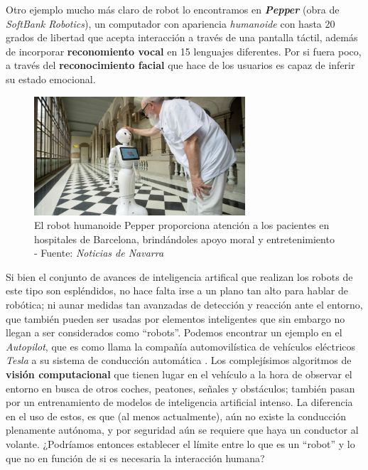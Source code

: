 Otro ejemplo mucho más claro de robot lo encontramos en \textbf{\textit{Pepper}} \cite{pepper-robot} (obra de \textit{SoftBank Robotics}), un computador con apariencia \textit{humanoide} con hasta 20 grados de libertad que acepta interacción a través de una pantalla táctil, además de incorporar \textbf{reconomiento vocal} en 15 lenguajes diferentes. Por si fuera poco, a través del \textbf{reconocimiento facial} que hace de los usuarios es capaz de inferir su estado emocional.\\

\begin{figure}[h]
	\centering
	\includegraphics[width=0.7\textwidth]{imagenes/pepper-hospital.jpg}
	\caption{El robot humanoide Pepper proporciona atención a los pacientes en hospitales de Barcelona, brindándoles apoyo moral y entretenimiento - Fuente: \textit{Noticias de Navarra} \cite{pepper-noticias}}
\end{figure}

Si bien el conjunto de avances de inteligencia artifical que realizan los robots de este tipo son espléndidos, no hace falta irse a un plano tan alto para hablar de robótica; ni aunar medidas tan avanzadas de detección y reacción ante el entorno, que también pueden ser usadas por elementos inteligentes que sin embargo no llegan a ser considerados como ``robots''. Podemos encontrar un ejemplo en el \textit{Autopilot}, que es como llama la compañía automovilística de vehículos eléctricos \textit{Tesla} a su sistema de conducción automática \cite{tesla-ai}. Los complejísimos algoritmos de \textbf{visión computacional} que tienen lugar en el vehículo a la hora de observar el entorno en busca de otros coches, peatones, señales y obstáculos; también pasan por un entrenamiento de modelos de inteligencia artificial intenso. La diferencia en el uso de estos, es que (al menos actualmente), aún no existe la conducción plenamente autónoma, y por seguridad aún se requiere que haya un conductor al volante. ¿Podríamos entonces establecer el límite entre lo que es un ``robot'' y lo que no en función de si es necesaria la interacción humana?\\

